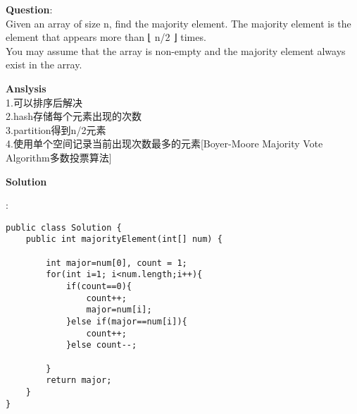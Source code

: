     
\begin{description}
    \item{\textbf{Question}}:\\%
		Given an array of size n, find the majority element. The majority element is the element that appears more than ⌊ n/2 ⌋ times.\\
		You may assume that the array is non-empty and the majority element always exist in the array.\\

    \item{\textbf{Anslysis}}\\
		1.可以排序后解决\\
		2.hash存储每个元素出现的次数\\
		3.partition得到n/2元素\\
		4.使用单个空间记录当前出现次数最多的元素[Boyer-Moore Majority Vote Algorithm多数投票算法]\\

    \item{\textbf{Solution}}\\
	\item{} : \\
		\begin{lstlisting}
public class Solution {
    public int majorityElement(int[] num) {

        int major=num[0], count = 1;
        for(int i=1; i<num.length;i++){
            if(count==0){
                count++;
                major=num[i];
            }else if(major==num[i]){
                count++;
            }else count--;

        }
        return major;
    }
}
		\end{lstlisting}

\end{description}

